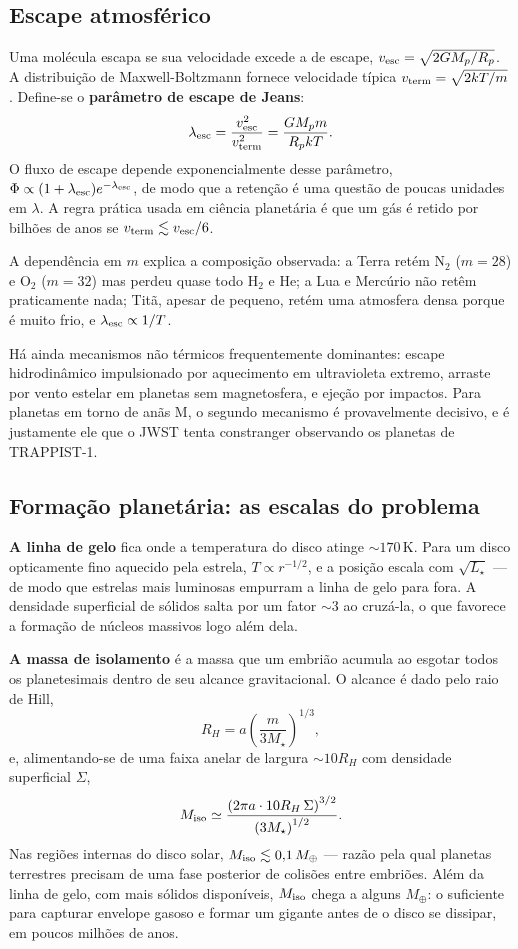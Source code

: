 \documentclass[11pt,a4paper]{article}
\begin{document}
\subsection*{Escape atmosférico}

Uma molécula escapa se sua velocidade excede a de escape, $v_{\rm esc}=\sqrt{2GM_p/R_p}$. A distribuição de Maxwell-Boltzmann fornece velocidade típica $v_{\rm term}=\sqrt{2kT/m}$. Define-se o \textbf{parâmetro de escape de Jeans}:
\[
\lambda_{\rm esc}=\frac{v_{\rm esc}^{2}}{v_{\rm term}^{2}}=\frac{GM_pm}{R_pkT}.
\]
O fluxo de escape depende exponencialmente desse parâmetro, $\Phi\propto(1+\lambda_{\rm esc})e^{-\lambda_{\rm esc}}$, de modo que a retenção é uma questão de poucas unidades em $\lambda$. A regra prática usada em ciência planetária é que um gás é retido por bilhões de anos se $v_{\rm term}\lesssim v_{\rm esc}/6$.

A dependência em $m$ explica a composição observada: a Terra retém N$_2$ ($m=28$) e O$_2$ ($m=32$) mas perdeu quase todo H$_2$ e He; a Lua e Mercúrio não retêm praticamente nada; Titã, apesar de pequeno, retém uma atmosfera densa porque é muito frio, e $\lambda_{\rm esc}\propto1/T$.

Há ainda mecanismos não térmicos frequentemente dominantes: escape hidrodinâmico impulsionado por aquecimento em ultravioleta extremo, arraste por vento estelar em planetas sem magnetosfera, e ejeção por impactos. Para planetas em torno de anãs M, o segundo mecanismo é provavelmente decisivo, e é justamente ele que o JWST tenta constranger observando os planetas de TRAPPIST-1.

\subsection*{Formação planetária: as escalas do problema}

\textbf{A linha de gelo} fica onde a temperatura do disco atinge $\sim170\,\mathrm{K}$. Para um disco opticamente fino aquecido pela estrela, $T\propto r^{-1/2}$, e a posição escala com $\sqrt{L_\star}$ --- de modo que estrelas mais luminosas empurram a linha de gelo para fora. A densidade superficial de sólidos salta por um fator $\sim3$ ao cruzá-la, o que favorece a formação de núcleos massivos logo além dela.

\textbf{A massa de isolamento} é a massa que um embrião acumula ao esgotar todos os planetesimais dentro de seu alcance gravitacional. O alcance é dado pelo raio de Hill,
\[
R_H=a\left(\frac{m}{3M_\star}\right)^{1/3},
\]
e, alimentando-se de uma faixa anelar de largura $\sim10R_H$ com densidade superficial $\Sigma$,
\[
M_{\rm iso}\simeq\frac{\left(2\pi a\cdot 10R_H\,\Sigma\right)^{3/2}}{\left(3M_\star\right)^{1/2}}.
\]
Nas regiões internas do disco solar, $M_{\rm iso}\lesssim0{,}1\,M_\oplus$ --- razão pela qual planetas terrestres precisam de uma fase posterior de colisões entre embriões. Além da linha de gelo, com mais sólidos disponíveis, $M_{\rm iso}$ chega a alguns $M_\oplus$: o suficiente para capturar envelope gasoso e formar um gigante antes de o disco se dissipar, em poucos milhões de anos.
\end{document}
